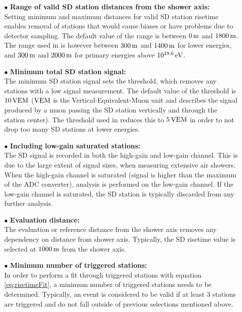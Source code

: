 \documentclass[12pt,a4paper]{report}
\begin{document}
\begin{itemize}
\item[$\bullet$] \textbf{Range of valid SD station distances from the shower axis:}\\
Setting minimum and maximum distances for valid SD station risetime enables removal of stations that would cause biases or have problems due to detector sampling. The default value of the range is between $\unit[0]{m}$ and $\unit[1800]{m}$. The range used in \cite{deltaMethod} is however between $\unit[300]{m}$ and $\unit[1400]{m}$ for lower energies, and $\unit[300]{m}$ and $\unit[2000]{m}$ for primary energies above $\unit[10^{19.6}]{eV}$.
\item[$\bullet$] \textbf{Minimum total SD station signal:}\\
The minimum SD station signal sets the threshold, which removes any stations with a low signal measurement. The default value of the threshold is $\unit[10]{VEM}$ ($\unit[]{VEM}$ is the Vertical-Equivalent-Muon unit and describes the signal produced by a muon passing the SD station vertically and through the station center). The threshold used in \cite{deltaMethod} reduces this to $\unit[5]{VEM}$ in order to not drop too many SD stations at lower energies.
\item[$\bullet$] \textbf{Including low-gain saturated stations:}\\
The SD signal is recorded in both the high-gain and low-gain channel. This is due to the large extent of signal sizes, when measuring extensive air showers. When the high-gain channel is saturated (signal is higher than the maximum of the ADC converter), analysis is performed on the low-gain channel. If the low-gain channel is saturated, the SD station is typically discarded from any further analysis.
\item[$\bullet$] \textbf{Evaluation distance:}\\
The evaluation or reference distance from the shower axis removes any dependency on distance from shower axis. Typically, the SD risetime value is selected at $\unit[1000]{m}$ from the shower axis.
\item[$\bullet$] \textbf{Minimum number of triggered stations:}\\
In order to perform a fit through triggered stations with equation \eqref{eq:risetimeFit}, a minimum number of triggered stations needs to be determined. Typically, an event is considered to be valid if at least 3 stations are triggered and do not fall outside of previous selections mentioned above.
\end{itemize}
\end{document}

